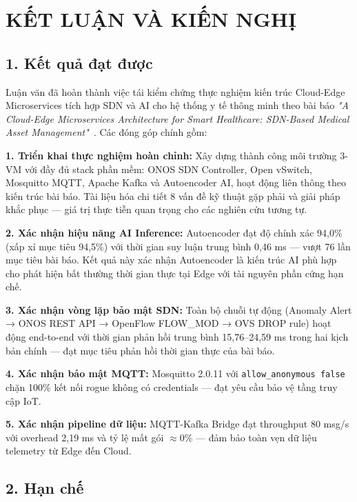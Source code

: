 {}
\chapter*{KẾT LUẬN VÀ KIẾN NGHỊ}

\section*{1. Kết quả đạt được}

Luận văn đã hoàn thành việc tái kiểm chứng thực nghiệm kiến trúc Cloud-Edge Microservices tích hợp SDN và AI cho hệ thống y tế thông minh theo bài báo \textit{"A Cloud-Edge Microservices Architecture for Smart Healthcare: SDN-Based Medical Asset Management"}~\cite{paper_main}. Các đóng góp chính gồm:

\textbf{1. Triển khai thực nghiệm hoàn chỉnh:} Xây dựng thành công môi trường 3-VM với đầy đủ stack phần mềm: ONOS SDN Controller, Open vSwitch, Mosquitto MQTT, Apache Kafka và Autoencoder AI, hoạt động liên thông theo kiến trúc bài báo. Tài liệu hóa chi tiết 8 vấn đề kỹ thuật gặp phải và giải pháp khắc phục — giá trị thực tiễn quan trọng cho các nghiên cứu tương tự.

\textbf{2. Xác nhận hiệu năng AI Inference:} Autoencoder đạt độ chính xác 94,0\% (xấp xỉ mục tiêu 94,5\%) với thời gian suy luận trung bình 0,46 ms — vượt 76 lần mục tiêu bài báo. Kết quả này xác nhận Autoencoder là kiến trúc AI phù hợp cho phát hiện bất thường thời gian thực tại Edge với tài nguyên phần cứng hạn chế.

\textbf{3. Xác nhận vòng lặp bảo mật SDN:} Toàn bộ chuỗi tự động (Anomaly Alert → ONOS REST API → OpenFlow FLOW\_MOD → OVS DROP rule) hoạt động end-to-end với thời gian phản hồi trung bình 15,76–24,59 ms trong hai kịch bản chính — đạt mục tiêu phản hồi thời gian thực của bài báo.

\textbf{4. Xác nhận bảo mật MQTT:} Mosquitto 2.0.11 với \texttt{allow\_anonymous false} chặn 100\% kết nối rogue không có credentials — đạt yêu cầu bảo vệ tầng truy cập IoT.

\textbf{5. Xác nhận pipeline dữ liệu:} MQTT-Kafka Bridge đạt throughput 80 msg/s với overhead 2,19 ms và tỷ lệ mất gói $\approx$0\% — đảm bảo toàn vẹn dữ liệu telemetry từ Edge đến Cloud.

\section*{2. Hạn chế}


